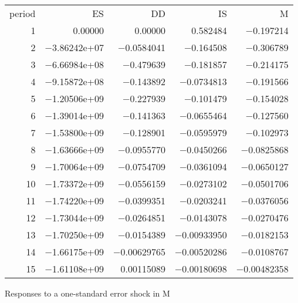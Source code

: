 \documentclass[11pt]{article}
\begin{document}
\begin{longtable}{rrrrr}
period &  ES &  DD &  IS &  M \\
1 & 0.00000 & 0.00000 & 0.582484 & $-$0.197214\\
2 & $-$3.86242\textrm{e+07} & $-$0.0584041 & $-$0.164508 & $-$0.306789\\
3 & $-$6.66984\textrm{e+08} & $-$0.479639 & $-$0.181857 & $-$0.214175\\
4 & $-$9.15872\textrm{e+08} & $-$0.143892 & $-$0.0734813 & $-$0.191566\\
5 & $-$1.20506\textrm{e+09} & $-$0.227939 & $-$0.101479 & $-$0.154028\\
6 & $-$1.39014\textrm{e+09} & $-$0.141363 & $-$0.0655464 & $-$0.127560\\
7 & $-$1.53800\textrm{e+09} & $-$0.128901 & $-$0.0595979 & $-$0.102973\\
8 & $-$1.63666\textrm{e+09} & $-$0.0955770 & $-$0.0450266 & $-$0.0825868\\
9 & $-$1.70064\textrm{e+09} & $-$0.0754709 & $-$0.0361094 & $-$0.0650127\\
10 & $-$1.73372\textrm{e+09} & $-$0.0556159 & $-$0.0273102 & $-$0.0501706\\
11 & $-$1.74220\textrm{e+09} & $-$0.0399351 & $-$0.0203241 & $-$0.0376056\\
12 & $-$1.73044\textrm{e+09} & $-$0.0264851 & $-$0.0143078 & $-$0.0270476\\
13 & $-$1.70250\textrm{e+09} & $-$0.0154389 & $-$0.00933950 & $-$0.0182153\\
14 & $-$1.66175\textrm{e+09} & $-$0.00629765 & $-$0.00520286 & $-$0.0108767\\
15 & $-$1.61108\textrm{e+09} & 0.00115089 & $-$0.00180698 & $-$0.00482358\\
\end{longtable}

\vspace{1em}

Responses to a one-standard error shock in M

\vspace{1em}
\end{document}
